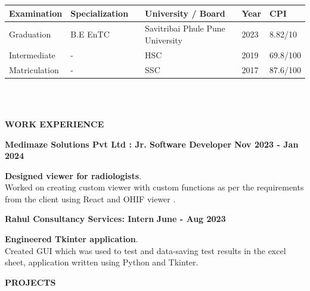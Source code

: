 \documentclass[a4paper,10pt]{article}
\begin{document}
\vspace{-.8cm}

\begin{tabularx}{.98\textwidth}{llp{2cm}lll}
  \hline
  \textbf{Examination} & \textbf{Specialization}          &  & \textbf{University / Board} & \textbf{Year} & \textbf{CPI} \\
  \hline
  Graduation           & B.E EnTC &  & Savitribai Phule Pune University                       & 2023          & 8.82/10      \\
  Intermediate         & -                                &  & HSC                         & 2019          & 69.8/100     \\
  Matriculation        & -                                &  & SSC                         & 2017          & 87.6/100     \\
  \hline
\end{tabularx}
\\\\

\colorbox{titleColor}{\parbox{6.7in}{\textbf{WORK EXPERIENCE}}}

\begin{itemize*}
  \setlength{\itemsep}{.00pt}
  \item \textbf{{Medimaze Solutions Pvt Ltd : Jr. Software Developer}} \hfill {\small{{\textbf{Nov 2023 - Jan 2024}}\/}}
  \begin{itemize*}
    \item \textbf{Designed viewer for radiologists}.\\
    Worked on creating custom viewer with custom functions as per the requirements from the client using React and OHIF viewer .
  \end{itemize*}
\end{itemize*}

\begin{itemize*}
  \setlength{\itemsep}{.00pt}
  \item \textbf{{Rahul Consultancy Services: Intern}} \hfill {\small{{\textbf{June - Aug 2023}}\/}}
  \begin{itemize*}
    \item \textbf{Engineered Tkinter application}.\\
    Created GUI which was used to test and data-saving test results in the excel sheet, application written using Python and Tkinter.
  \end{itemize*}
\end{itemize*}

\colorbox{titleColor}{\parbox{6.7in}{\textbf{ PROJECTS}}}
\end{document}
